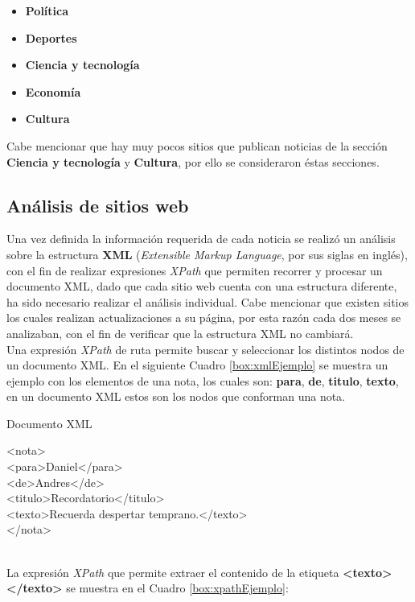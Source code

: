\begin{itemize}
    \item \textbf{Política}
    \item \textbf{Deportes}
    \item \textbf{Ciencia y tecnología}
    \item \textbf{Economía}
    \item \textbf{Cultura}
\end{itemize}

Cabe mencionar que hay muy pocos sitios que publican noticias de la sección \textbf{Ciencia y tecnología} y \textbf{Cultura}, por ello se consideraron éstas secciones.

\subsection{Análisis de sitios web}

Una vez definida la información requerida de cada noticia se realizó un análisis sobre la estructura \textbf{XML} (\textit{Extensible Markup Language}, por sus siglas en inglés), con el fin de realizar expresiones \textit{XPath} que permiten recorrer y procesar un documento XML, dado que cada sitio web cuenta con una estructura diferente, ha sido necesario realizar el análisis individual. Cabe mencionar que existen sitios los cuales realizan actualizaciones a su página, por esta razón cada dos meses se analizaban, con el fin de verificar que la estructura XML no cambiará.\\

Una expresión \textit{XPath} de ruta permite buscar y seleccionar los distintos nodos de un documento XML. En el siguiente Cuadro \ref{box:xmlEjemplo} se muestra un ejemplo con los elementos de una nota, los cuales son: \textbf{para}, \textbf{de}, \textbf{titulo}, \textbf{texto}, en un documento XML estos son los nodos que conforman una nota.\\

\begin{mygraybox}[label={box:xmlEjemplo}]{Documento XML}
\begin{tabbing}
<nota> \= \\\kill
\>	<para>Daniel</para>\\
\>	<de>Andres</de>\\
\>	<titulo>Recordatorio</titulo>\\
\>	<texto>Recuerda despertar temprano.</texto>\\
</nota>
\end{tabbing}
\end{mygraybox}
\ \\
La expresión \textit{XPath} que permite extraer el contenido de la etiqueta \textbf{<texto> </texto>} se muestra en el Cuadro \ref{box:xpathEjemplo}: \\

